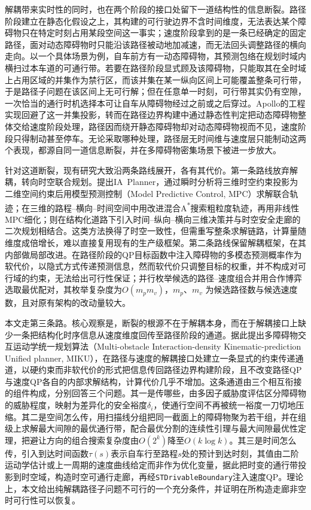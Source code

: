\documentclass[a4paper,11pt]{ctexart}
\theoremstyle{definition}
\begin{document}
解耦带来实时性的同时，也在两个阶段的接口处留下一道结构性的信息断裂。路径阶段建立在静态化假设之上，其构建的可行驶边界不含时间维度，无法表达某个障碍物只在特定时刻占用某段空间这一事实；速度阶段拿到的是一条已经确定的固定路径，面对动态障碍物时只能沿该路径被动地加减速，而无法回头调整路径的横向走向。以一个具体场景为例，自车前方有一动态障碍物，其预测包络在规划时域内横扫过本车道的可通行带。若要在路径阶段显式顾及该障碍物，只能取其在全时域上占用区域的并集作为禁行区，而该并集在某一纵向区间上可能覆盖整条可行带，于是路径子问题在该区间上无可行解；但在任意单一时刻，可行带其实仍有空隙，一次恰当的通行时机选择本可让自车从障碍物经过之前或之后穿过。Apollo的工程实现回避了这一并集投影，转而在路径边界构建中通过静态性判定把动态障碍物整体交给速度阶段处理，路径因而绕开静态障碍物却对动态障碍物视而不见，速度阶段只得制动甚至停车。无论采取哪种处理，路径层无时间维与速度层只能制动这两个表现，都源自同一道信息断裂，并在多障碍物密集场景下被进一步放大\citep{gonzalez2016}。

针对这道断裂，现有研究大致沿两条路线展开，各有其代价。第一条路线放弃解耦，转向时空联合规划。\citet{yang2021_ia_planner}提出IA~Planner，通过瞬时分析将三维时空约束投影为二维空间约束后用模型预测控制（Model Predictive Control, MPC）求解联合轨迹；\citet{hu2023_hybrid_astar_slt}在三维的路程--横向--时间空间中用改进混合A\textsuperscript{*}搜索粗粒度轨迹，再用非线性MPC细化；\citet{qiao2025stjoint}则在结构化道路下引入时间--纵向--横向三维决策并与时空安全走廊的二次规划相结合。这类方法换得了时空一致性，但需重写整条求解链路，计算量随维度成倍增长，难以直接复用现有的生产级框架。第二条路线保留解耦框架，在其内部做局部改进。\citet{han2026_contingency}在路径阶段的QP目标函数中注入障碍物的多模态预测概率作为软代价，以隐式方式传递预测信息，然而软代价只调整目标的权重，并不构成对可行域的约束，无法给出可行性保证；\citet{zhang2023_dp_rcg}并行枚举候选的路径--速度组合并用合作博弈选取最优配对，其枚举复杂度为$O(m_p m_v)$，$m_p$、$m_v$ 为候选路径数与候选速度数，且对原有架构的改动量较大。

本文走第三条路。核心观察是，断裂的根源不在于解耦本身，而在于解耦接口上缺少一条把结构化时序信息从速度维度回传至路径阶段的通道。据此提出多障碍物交互运动学统一规划算法（Multi-obstacle Interaction-density Kinematic-prediction Unified planner, MIKU），在路径与速度的解耦接口处建立一条显式的约束传递通道，以硬约束而非软代价的形式把信息传回路径边界构建阶段，且不改变路径QP与速度QP各自的内部求解结构，计算代价几乎不增加。这条通道由三个相互衔接的组件构成，分别回答三个问题。其一是传哪些，由多因子威胁度评估区分障碍物的威胁程度，映射为差异化的安全裕度$\delta_i$，使通行空间不再被统一裕度一刀切地压缩。其二是空间怎么传，用扫描线分组把同一截面上的障碍物聚为若干组，并在组级上求解最大间隙的最优通行带，配合最优分割的连续性引理与最大间隙最优性定理，把避让方向的组合搜索复杂度由$O(2^k)$降至$O(k\log k)$。其三是时间怎么传，引入到达时间函数$\tau(s)$表示自车行至路程$s$处的预计到达时刻，其值由二阶运动学估计或上一周期的速度曲线给定而非作为优化变量，据此把时变的通行带投影到时空域，构造时空可通行走廊，再经\texttt{STDrivableBoundary}注入速度QP。理论上，本文给出纯解耦路径子问题不可行的一个充分条件，并证明在所构造走廊非空时可行性可以恢复。
\end{document}

